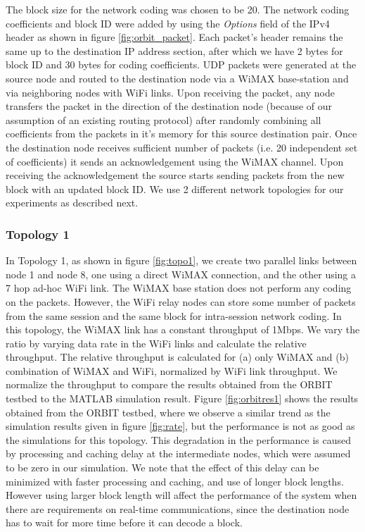\documentclass{sig-alternate-10pt}
\begin{document}
The block size  for the network coding was chosen to be 20.  The network coding coefficients and block ID were added by using the \emph{Options} field of the IPv4 header as shown in figure \ref{fig:orbit_packet}. Each packet's header  remains the same up to the destination IP address section, after which we have 2 bytes for block ID and 30 bytes for coding coefficients.  UDP packets were generated at the source node and routed  to the destination node via a WiMAX base-station and via neighboring nodes with WiFi links. Upon receiving the packet, any node transfers the packet in the direction of the destination node (because of our assumption of an existing routing protocol) after randomly combining all coefficients from the packets in it's memory for this source destination pair. Once the destination node receives sufficient number of packets (i.e. 20 independent set of coefficients) it sends an acknowledgement using the WiMAX channel. Upon receiving the acknowledgement the source starts sending packets from the new block with an updated block ID. We use 2 different network topologies for our experiments as described next.


\subsubsection{Topology 1}
In Topology 1, as shown  in figure \ref{fig:topo1}, we create  two parallel links between node 1 and node 8, one using a direct WiMAX connection, and the other using a  7 hop ad-hoc WiFi link. The WiMAX base station does not perform any coding on the packets. However, the WiFi relay nodes can store some number of packets from the same session and the same block for intra-session network coding.  In this topology, the  WiMAX link has a constant throughput of 1Mbps.   We vary the ratio  by varying data rate in the WiFi links and calculate the relative throughput. The relative throughput is calculated  for (a) only WiMAX and (b) combination of WiMAX and WiFi,  normalized by WiFi link throughput. We normalize the throughput to compare the results obtained from the ORBIT testbed to the MATLAB simulation result. Figure \ref{fig:orbitres1} shows the results obtained from the ORBIT testbed, where we observe a  similar trend as the simulation results  given in figure \ref{fig:rate}, but the performance is not as good as the simulations for this topology. This degradation in the  performance is caused by  processing and caching delay at the intermediate nodes, which were assumed to be zero in our simulation. We note that the effect of this delay can be minimized with faster processing and caching, and use of longer block lengths.  However using larger block length will affect the performance of the system when there are requirements on real-time communications, since the destination node has to wait  for more time before it can decode a block.
\end{document}
